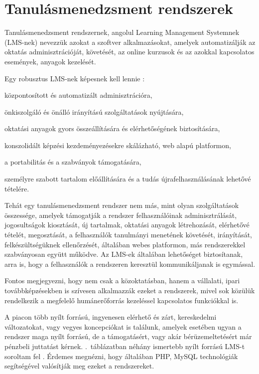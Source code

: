 \chapter{Tanulásmenedzsment rendszerek}
Tanulásmenedzsment rendszernek, angolul Learning Management Systemnek (LMS-nek) nevezzük azokat a szoftver alkalmazásokat, amelyek automatizálják az oktatás adminisztrációját, követését, az online kurzusok és az azokkal kapcsolatos események, anyagok kezelését.

Egy robusztus LMS-nek képesnek kell lennie \cite{link:ell}:
\begin{sajat_itemize}
\setlength{\itemsep}{0pt}
\item központosított és automatizált adminisztrációra,
\item önkiszolgáló és önálló irányítású szolgáltatások nyújtására,
\item oktatási anyagok gyors összeállítására és elérhetőségének biztosítására,
\item konszolidált képzési kezdeményezésekre skálázható, web alapú platformon,
\item a portabilitás és a szabványok támogatására,
\item személyre szabott tartalom előállítására és a tudás újrafelhasználásának lehetővé tételére.
\end{sajat_itemize}

Tehát egy tanulásmenedzsment rendszer nem más, mint olyan szolgáltatások összessége, amelyek támogatják a rendszer felhasználóinak adminisztrálását, jogosultságok kiosztását, új tartalmak, oktatási anyagok létrehozását, elérhetővé tételét, megosztását, a felhasználók tanulmányi menetének követését, irányítását, felkészültségüknek ellenőrzését, általában webes platformon, más rendszerekkel szabványosan együtt működve. Az LMS-ek általában lehetőséget biztosítanak, arra is, hogy a felhasználók a rendszeren keresztül kommunikáljanak is egymással.

Fontos megjegyezni, hogy nem csak a közoktatásban, hanem a vállalati, ipari továbbképzésekben is szívesen alkalmazzák ezeket a rendszerek, mivel sok közülük rendelkezik a megfelelő humánerőforrás kezeléssel kapcsolatos funkciókkal is.

A piacon több nyílt forrású, ingyenesen elérhető és zárt, kereskedelmi változatokat, vagy vegyes koncepciókat is találunk, amelyek esetében ugyan a rendszer maga nyílt forrású, de a támogatásért, vagy akár bérüzemeltetésért már pénzbeli juttatást kérnek. .~táblázatban néhány ismertebb nyílt forrású LMS-t soroltam fel \cite{link:lms}. Érdemes megnézni, hogy általában PHP, MySQL technológiák segítségével valósítják meg ezeket a rendszereket.

